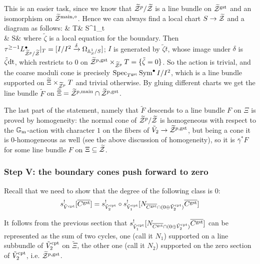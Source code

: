 This is an easier task, since we know that $\widetilde{\mathcal Z}^p/\widetilde{\mathcal Z}$ is a line bundle on $\widetilde{\mathcal Z}^{\rm{gst}}$ and an isomorphism on $\widetilde{\mathcal Z}^{\rm{main},\circ}$. Hence we can always find a local chart $S\rightarrow \widetilde{\mathcal Z}$ and a diagram as follows:
\bcd
\tZp\ar[d] & T\ar[l]\ar[d] & S\times\Aaff^1_t\ar[ld] \\
\tZ & S\ar[l,"\acute{e}t"] &
\ecd
where $\tilde\zeta$ is a local equation for the boundary. Then $\tau^{\geq-1}L^{\bullet}_{\widetilde{\mathcal Z}^p/\widetilde{\mathcal Z}}\rvert_T=[I/I^2\xrightarrow{\delta}\Omega_{\mathbb{A}^1_S/S}]$; $I$ is generated by $\tilde\zeta t$, whose image under $\delta$ is $\tilde\zeta \rm{d}t$, which restricts to $0$ on $\widetilde{\mathcal Z}^{p,\rm{gst}}\times_{\widetilde{\mathcal Z}^p}T=\{\tilde\zeta=0\}$. So the action is trivial, and the coarse moduli cone is precisely $\operatorname{Spec}_{T^{\rm{gst}}}\operatorname{Sym}^{\bullet} I/I^2$, which is a line bundle supported on $\widetilde{\Xi}\times_{\widetilde{\mathcal Z}^p}T$ and trivial otherwise. By gluing different charts we get the line bundle $\tilde F$ on $\widetilde{\Xi}=\widetilde{\mathcal Z}^{p,\rm{main}}\cap\widetilde{\mathcal Z}^{p,\rm{gst}}$.

The last part of the statement, namely that $\tilde F$ descends to a line bundle $F$ on $\Xi$ is proved by homogeneity: the normal cone of $\widetilde{\mathcal Z}^p/\widetilde{\mathcal Z}$ is homogeneous with respect to the $\mathbb{G}_{\text{m}}$-action with character $1$ on the fibers of $\tilde{V}_2\rightarrow \widetilde{\mathcal Z}^{p,\rm{gst}}$, but being a cone it is $0$-homogeneous as well (see the above discussion of homogeneity), so it is $\bar\gamma^*F$ for some line bundle $F$ on $\Xi\subseteq \widetilde{\mathcal Z}$.

\subsubsection{Step V: the boundary cones push forward to zero} Recall that we need to show that the degree of the following class is $0$:
\[
 s_{\tilde{V}^{\rm{cpt}}}^![\overline {C^{\rm{gst}}}]=s_{\tilde{V}_2^{\rm{cpt}}}^!\circ s_{\tilde{V}_1^{\rm{cpt}}}^![N_{\overline {C^{\rm{gst}}}\cap (0\oplus {\tilde{V}_2^{\rm{cpt}}})}\overline {C^{\rm{gst}}}]
\]

It follows from the previous section that $s_{\tilde{V}_1^{\rm{cpt}}}^![N_{\overline {C^{\rm{gst}}}\cap (0\oplus {\tilde{V}_2^{\rm{cpt}}})}\overline {C^{\rm{gst}}}]$ can be represented as the sum of two cycles, one (call it $N_1$) supported on a line subbundle of $\tilde{V}_2^{\rm{cpt}}$ on $\widetilde\Xi$, the other one (call it $N_2$) supported on the zero section of $\tilde{V}_2^{\rm{cpt}}$, i.e. $\widetilde{\mathcal Z}^{p,\rm{gst}}$.


